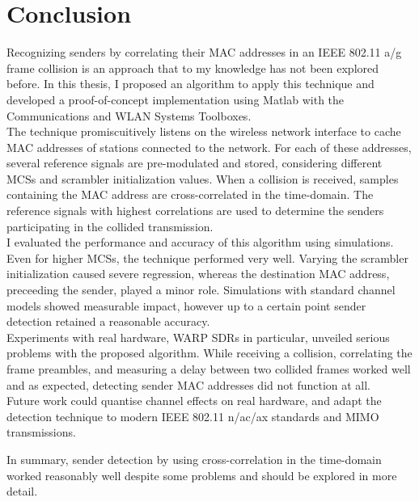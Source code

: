 
\chapter{Conclusion}\label{ch:Conclusion}
\glsresetall %

Recognizing senders by correlating their MAC addresses in an IEEE 802.11 a/g frame collision is an approach that to my knowledge has not been explored before. In this thesis, I proposed an algorithm to apply this technique and developed a proof-of-concept implementation using Matlab with the Communications and WLAN Systems Toolboxes.\\

The technique promiscuitively listens on the wireless network interface to cache MAC addresses of stations connected to the network. For each of these addresses, several reference signals are pre-modulated and stored, considering different \glspl{MCS} and scrambler initialization values. When a collision is received, samples containing the MAC address are cross-correlated in the time-domain. The reference signals with highest correlations are used to determine the senders participating in the collided transmission.\\

I evaluated the performance and accuracy of this algorithm using simulations. Even for higher \glspl{MCS}, the technique performed very well. Varying the scrambler initialization caused severe regression, whereas the destination MAC address, preceeding the sender, played a minor role. Simulations with standard channel models showed measurable impact, however up to a certain point sender detection retained a reasonable accuracy.\\

Experiments with real hardware, \gls{WARP} \glspl{SDR} in particular, unveiled serious problems with the proposed algorithm. While receiving a collision, correlating the frame preambles, and measuring a delay between two collided frames worked well and as expected, detecting sender MAC addresses did not function at all.\\

Future work could quantise channel effects on real hardware, and adapt the detection technique to modern IEEE 802.11 n/ac/ax standards and \gls{MIMO} transmissions.

In summary, sender detection by using cross-correlation in the time-domain worked reasonably well despite some problems and should be explored in more detail.
